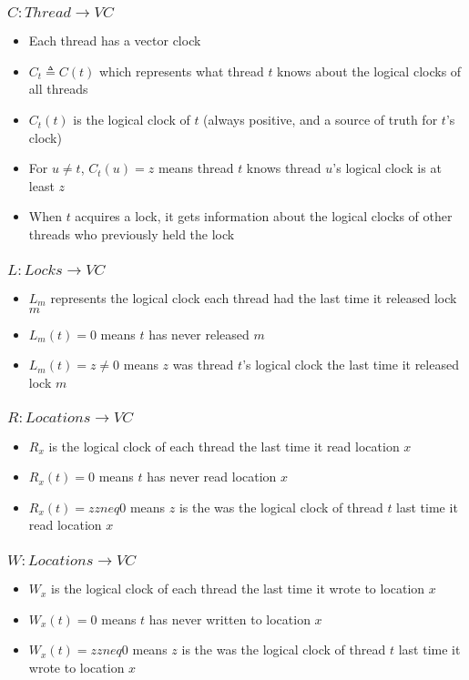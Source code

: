 \subsubsection{$C: Thread \to VC$}
\begin{itemize}
    \item Each thread has a vector clock
    \item $C_t \triangleq C(t)$ which represents what thread $t$ knows about the logical clocks of all threads
    \item $C_t(t)$ is the logical clock of $t$ (always positive, and a source of truth for $t$'s clock)
    \item For $u \neq t$, $C_t(u)=z$ means thread $t$ knows thread $u$'s logical clock is at least $z$
    \item When $t$ acquires a lock, it gets information about the logical clocks of other threads who previously held the lock
\end{itemize}

\subsubsection{$L: Locks \to VC$}
\begin{itemize}
    \item $L_m$ represents the logical clock each thread had the last time it released lock $m$
    \item $L_m(t) = 0$ means $t$ has never released $m$
    \item $L_m(t) = z \neq 0$ means $z$ was thread $t$'s logical clock the last time it released lock $m$
\end{itemize}

\subsubsection{$R: Locations \to VC$}
\begin{itemize}
    \item $R_x$ is the logical clock of each thread the last time it read location $x$
    \item $R_x(t) = 0$ means $t$ has never read location $x$
    \item $R_x(t) = z zneq 0$ means $z$ is the was the logical clock of thread $t$ last time it read location $x$
\end{itemize}

\subsubsection{$W: Locations \to VC$}
\begin{itemize}
    \item $W_x$ is the logical clock of each thread the last time it wrote to location $x$
    \item $W_x(t) = 0$ means $t$ has never written to location $x$
    \item $W_x(t) = z zneq 0$ means $z$ is the was the logical clock of thread $t$ last time it wrote to location $x$
\end{itemize}

